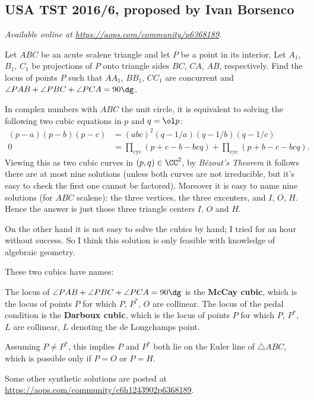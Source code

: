 \documentclass[11pt]{scrartcl}
\begin{document}
\subsection{USA TST 2016/6, proposed by Ivan Borsenco}
\textsl{Available online at \url{https://aops.com/community/p6368189}.}
\begin{mdframed}[style=mdpurplebox,frametitle={Problem statement}]
Let $ABC$ be an acute scalene triangle
and let $P$ be a point in its interior.
Let $A_1$, $B_1$, $C_1$ be projections of $P$ onto
triangle sides $BC$, $CA$, $AB$, respectively.
Find the locus of points $P$ such that
$AA_1$, $BB_1$, $CC_1$ are concurrent
and $\angle PAB + \angle PBC + \angle PCA = 90\dg$.
\end{mdframed}
In complex numbers with $ABC$ the unit circle,
it is equivalent to solving the following two cubic equations
in $p$ and $q = \ol p$:
\begin{align*}
 (p-a)(p-b)(p-c) &= (abc)^2 (q -1/a)(q - 1/b)(q - 1/c) \\
 0 &= \prod_{\text{cyc}} (p+c-b-bcq) + \prod_{\text{cyc}} (p+b-c-bcq).
\end{align*}
Viewing this as two cubic curves in $(p,q) \in \CC^2$,
by \emph{B\'ezout's Theorem} it follows there are at most nine solutions
(unless both curves are not irreducible,
but it's easy to check the first one cannot be factored).
Moreover it is easy to name nine solutions (for $ABC$ scalene):
the three vertices, the three excenters, and $I$, $O$, $H$.
Hence the answer is just those three triangle centers $I$, $O$ and $H$.

\begin{remark*}
  On the other hand it is not easy to solve the cubics by hand;
  I tried for an hour without success.
  So I think this solution is only feasible
  with knowledge of algebraic geometry.
\end{remark*}
\begin{remark*}
  These two cubics have names:
  \begin{itemize}
    \ii The locus of $\angle PAB + \angle PBC + \angle PCA = 90\dg$
    is the \textbf{McCay cubic},
    which is the locus of points $P$
    for which $P$, $P^\ast$, $O$ are collinear.
    \ii The locus of the pedal condition
    is the \textbf{Darboux cubic},
    which is the locus of points $P$
    for which $P$, $P^\ast$, $L$ are collinear,
    $L$ denoting the de Longchamps point.
  \end{itemize}
  Assuming $P \neq P^\ast$,
  this implies $P$ and $P^\ast$
  both lie on the Euler line of $\triangle ABC$,
  which is possible only if $P=O$ or $P=H$.

  Some other synthetic solutions are posted at
  \url{https://aops.com/community/c6h1243902p6368189}.
\end{remark*}
\pagebreak
\end{document}
